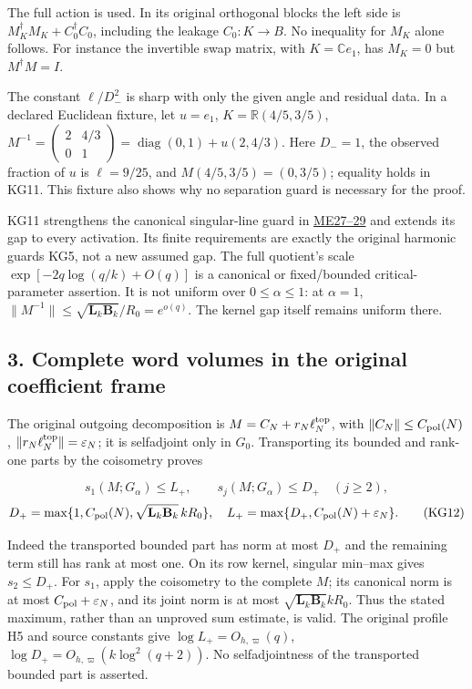 \documentclass[11pt]{article}
\begin{document}
The full action is used. In its original orthogonal blocks the left side is \(M_K^\dagger M_K+C_0^\dagger C_0\), including the leakage \(C_0:K\to B\). No inequality for \(M_K\) alone follows. For instance the invertible swap matrix, with \(K=\mathbb Ce_1\), has \(M_K=0\) but \(M^\dagger M=I\).

The constant \(\ell/D_-^2\) is sharp with only the given angle and residual data. In a declared Euclidean fixture, let \(u=e_1\), \(K=\mathbb R(4/5,3/5)\), \(M^{-1}=\left(\begin{smallmatrix}2&4/3\\0&1\end{smallmatrix}\right)=\operatorname{diag}(0,1)+u(2,4/3)\). Here \(D_-=1\), the observed fraction of \(u\) is \(\ell=9/25\), and \(M(4/5,3/5)=(0,3/5)\); equality holds in KG11. This fixture also shows why no separation guard is necessary for the proof.

KG11 strengthens the canonical singular-line guard in \href{https://github.com/KokunoYumeto/zeta-function-research-reader/blob/d44d94aa43d0a1934455ddac008368583f43a2c1/workbenches/splitzero-tandem/continuations/20260921-canonical-memory-filters/MEMORY_ENERGY_PROOFS.md}{ME27--29} and extends its gap to every activation. Its finite requirements are exactly the original harmonic guards KG5, not a new assumed gap. The full quotient's scale \(\exp[-2q\log(q/k)+O(q)]\) is a canonical or fixed/bounded critical-parameter assertion. It is not uniform over \(0\le\alpha\le1\): at \(\alpha=1\), \(\|M^{-1}\|\le\sqrt{\mathbf L_k\mathbf B_k}/R_0=e^{o(q)}\). The kernel gap itself remains uniform there.

\subsection{3. Complete word volumes in the original coefficient frame}\label{complete-word-volumes-in-the-original-coefficient-frame}

The original outgoing decomposition is \(M=C_N+r_N\ell_N^{\rm top}\), with \(\|C_N\|\le C_{\rm pol}(N)\), \(\|r_N\ell_N^{\rm top}\|=\varepsilon_N\); it is selfadjoint only in \(G_0\). Transporting its bounded and rank-one parts by the coisometry proves

\[
s_1(M;G_\alpha)\le L_+,\qquad s_j(M;G_\alpha)\le D_+\quad(j\ge2),
\] \[
D_+=\max\{1,C_{\rm pol}(N),\sqrt{\mathbf L_k\mathbf B_k}\,kR_0\},
\quad L_+=\max\{D_+,C_{\rm pol}(N)+\varepsilon_N\}.
\tag{KG12}
\]

Indeed the transported bounded part has norm at most \(D_+\) and the remaining term still has rank at most one. On its row kernel, singular min--max gives \(s_2\le D_+\). For \(s_1\), apply the coisometry to the complete \(M\); its canonical norm is at most \(C_{\rm pol}+\varepsilon_N\), and its joint norm is at most \(\sqrt{\mathbf L_k\mathbf B_k}kR_0\). Thus the stated maximum, rather than an unproved sum estimate, is valid. The original profile H5 and source constants give \(\log L_+=O_{h,\varpi}(q)\), \(\log D_+=O_{h,\varpi}(k\log^2(q+2))\). No selfadjointness of the transported bounded part is asserted.
\end{document}
